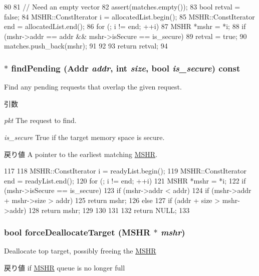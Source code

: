 \begin{DoxyCode}
80 {
81     // Need an empty vector
82     assert(matches.empty());
83     bool retval = false;
84     MSHR::ConstIterator i = allocatedList.begin();
85     MSHR::ConstIterator end = allocatedList.end();
86     for (; i != end; ++i) {
87         MSHR *mshr = *i;
88         if (mshr->addr == addr && mshr->isSecure == is_secure) {
89             retval = true;
90             matches.push_back(mshr);
91         }
92     }
93     return retval;
94 }
\end{DoxyCode}
\hypertarget{classMSHRQueue_affbbf09e05a34a8c06a00eeb8425be92}{
\subsubsection[{findPending}]{ $\ast$ findPending ({\bf Addr} {\em addr}, \/  int {\em size}, \/  bool {\em is\_\-secure}) const}}
\label{classMSHRQueue_affbbf09e05a34a8c06a00eeb8425be92}
Find any pending requests that overlap the given request. 
\begin{DoxyParams}{引数}
\item[{\em pkt}]The request to find. \item[{\em is\_\-secure}]True if the target memory space is secure. \end{DoxyParams}
\begin{DoxyReturn}{戻り値}
A pointer to the earliest matching \hyperlink{classMSHR}{MSHR}. 
\end{DoxyReturn}



\begin{DoxyCode}
117 {
118     MSHR::ConstIterator i = readyList.begin();
119     MSHR::ConstIterator end = readyList.end();
120     for (; i != end; ++i) {
121         MSHR *mshr = *i;
122         if (mshr->isSecure == is_secure) {
123             if (mshr->addr < addr) {
124                 if (mshr->addr + mshr->size > addr)
125                     return mshr;
126             } else {
127                 if (addr + size > mshr->addr)
128                     return mshr;
129             }
130         }
131     }
132     return NULL;
133 }
\end{DoxyCode}
\hypertarget{classMSHRQueue_acda43ebd9ff1813951d7d0ab3eaad05c}{
\subsubsection[{forceDeallocateTarget}]{\setlength{\rightskip}{0pt plus 5cm}bool forceDeallocateTarget ({\bf MSHR} $\ast$ {\em mshr})}}
\label{classMSHRQueue_acda43ebd9ff1813951d7d0ab3eaad05c}
Deallocate top target, possibly freeing the \hyperlink{classMSHR}{MSHR} \begin{DoxyReturn}{戻り値}
if \hyperlink{classMSHR}{MSHR} queue is no longer full 
\end{DoxyReturn}



